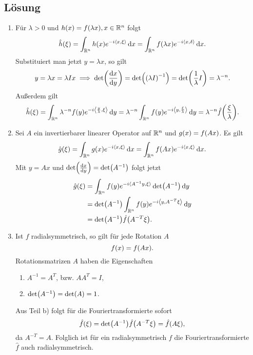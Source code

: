 \documentclass{exercise}
\begin{document}
    \subsection*{Lösung}
    \begin{enumerate}
        \item Für \(\lambda > 0\) und \(h\parentheses*{x} = f\parentheses*{\lambda x}, x \in \R^n\) folgt
        \[
            \hat{h}\parentheses*{\xi} = \int_{\R^n}h\parentheses*{x}e^{-i\angles*{x, \xi}}\d x = \int_{\R^n}f\parentheses*{\lambda x}e^{-i\angles*{x, \delta}}\d x.
        \]
        Substituiert man jetzt \(y = \lambda x\), so gilt
        \[
            y = \lambda x = \lambda Ix \implies \det\parentheses*{\frac{\d x}{\d y}} = \det\parentheses*{\parentheses*{\lambda I}^{-1}} = \det\parentheses*{\frac{1}{\lambda}I} = \lambda^{-n}.
        \]
        Außerdem gilt
        \[
            \hat{h}\parentheses*{\xi} = \int_{\R^n}\lambda^{-n}f\parentheses*{y}e^{-i\angles*{\frac{y}{\lambda}, \xi}}\d y = \lambda^{-n}\int_{\R^n}f\parentheses*{y}e^{-i\angles*{y, \frac{\xi}{\lambda}}}\d y = \lambda^{-n}\hat{f}\parentheses*{\frac{\xi}{\lambda}}.
        \]
        \item Sei \(A\) ein invertierbarer linearer Operator auf \(\mathbb{R}^n\) und \(g\parentheses*{x} = f\parentheses*{Ax}\).
        Es gilt
        \[
            \hat{g}\parentheses*{\xi} = \int_{\R^n}g\parentheses*{x}e^{-i\angles*{x, \xi}}\d x = \int_{\R^n}f\parentheses*{Ax}e^{-i\angles*{x, \xi}}\d x.
        \]
        Mit \(y = Ax\) und \(\det\parentheses*{\frac{\d x}{\d y}} = \det\parentheses*{A^{-1}}\) folgt jetzt
        \begin{align*}
            \hat{g}\parentheses*{\xi} &= \int_{\R^n}f\parentheses*{y}e^{-i\angles{A^{-1}y, \xi}}\det\parentheses*{A^{-1}}\d y\\
            &= \det\parentheses*{A^{-1}}\int_{\R^n}f\parentheses*{y}e^{-i\angles*{y, A^{-T}\xi}}\d y\\
            &= \det\parentheses*{A^{-1}}\hat{f}\parentheses*{A^{-T}\xi}.
        \end{align*}
        \item Ist \(f\) radialsymmetrisch, so gilt für jede Rotation \(A\)
        \[
            f\parentheses*{x} = f\parentheses*{Ax}.
        \]
        Rotationsmatrizen \(A\) haben die Eigenschaften
        \begin{enumerate}
            \item \(A^{-1} = A^T\), bzw. \(AA^T = I\),
            \item \(\det\parentheses*{A^{-1}} = \det\parentheses*{A} = 1\).
        \end{enumerate}
        Aus Teil b) folgt für die Fouriertransformierte sofort
        \[
            \hat{f}\parentheses*{\xi} = \det\parentheses*{A^{-1}}\hat{f}\parentheses*{A^{-T}\xi} = \hat{f}\parentheses*{A\xi},
        \]
        da \(A^{-T} = A\).
        Folglich ist für ein radialsymmetrisch \(f\) die Fouriertransformierte \(\hat{f}\) auch radialsymmetrisch.
    \end{enumerate}
\end{document}

